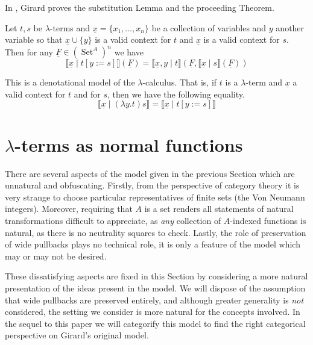 \documentclass[runningheads]{llncs}
\DeclareMathOperator{\set}{Set}
\begin{document}
In \cite{Girard}, Girard proves the substitution Lemma and the proceeding Theorem.

\begin{lemma}
    Let $t,s$ be $\lambda$-terms and $\underline{x} = \{ x_1, \ldots, x_{n} \}$ be a collection of variables and $y$ another variable so that $\underline{x} \cup \{ y \}$ is a valid context for $t$ and $\underline{x}$ is a valid context for $s$. Then for any $\underline{F}\in (\set^A)^{n}$ we have
		\begin{equation}\label{eq:sub_lem_cond}
			\llbracket \underline{x} \mid t[y := s]\rrbracket(\underline{F}) = \llbracket \underline{x}, y \mid t \rrbracket(\underline{F}, \llbracket \underline{x} \mid s \rrbracket (\underline{F}))
			\end{equation}
\end{lemma}

\begin{theorem}
    This is a denotational model of the $\lambda$-calculus. That is, if $t$ is a $\lambda$-term and $\underline{x}$ a valid context for $t$ and for $s$, then we have the following equality.
		\begin{equation}
			\llbracket \underline{x} \mid (\lambda y. t)s\rrbracket = \llbracket \underline{x} \mid t[y:=s]\rrbracket
			\end{equation}
\end{theorem}





\section{$\lambda$-terms as normal functions}\label{sec:normal_functions}
There are several aspects of the model given in the previous Section which are unnatural and obfuscating. Firstly, from the perspective of category theory it is very strange to choose particular representatives of finite sets (the Von Neumann integers). Moreover, requiring that $A$ is a set renders all statements of natural transformations difficult to appreciate, as \textit{any} collection of $A$-indexed functions is natural, as there is no neutrality squares to check. Lastly, the role of preservation of wide pullbacks plays no technical role, it is only a feature of the model which may or may not be desired.

These dissatisfying aspects are fixed in this Section by considering a more natural presentation of the ideas present in the model. We will dispose of the assumption that wide pullbacks are preserved entirely, and although greater generality is \textit{not} considered, the setting we consider is more natural for the concepts involved. In the sequel to this paper \cite{??} we will categorify this model to find the right categorical perspective on Girard's original model.
\end{document}
